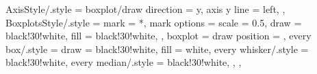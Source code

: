 
\def\BoxplotColor{black!30!white}
\pgfplotsset
{
	AxisStyle/.style =
	{
		boxplot/draw direction	= y,
		axis y line				= left,
	},
	BoxplotsStyle/.style =
	{
		mark			= *,
		mark options	=
		{
			scale 		= 0.5,
			draw		= \BoxplotColor,
			fill		= \BoxplotColor,
		},
		boxplot =
		{
			draw position			= \E,
			every box/.style		= {draw = \BoxplotColor, fill = white},
			every whisker/.style	= {\BoxplotColor},
			every median/.style		= {\BoxplotColor},
		},
	},
}


